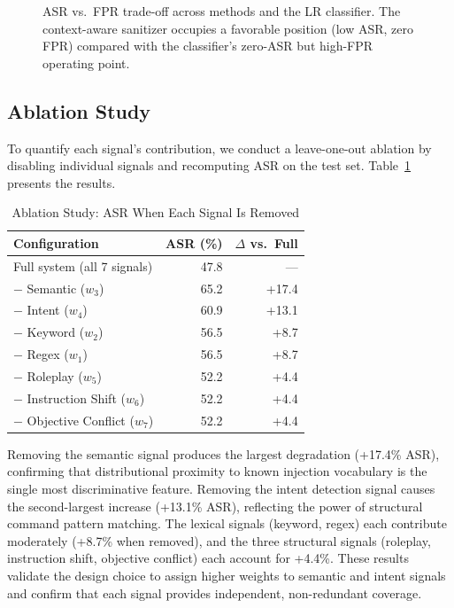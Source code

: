 \documentclass[10pt,conference]{IEEEtran}
\begin{document}
\begin{figure}[t]
  \centering
  \caption{ASR vs.\ FPR trade-off across methods and the LR
           classifier.
           The context-aware sanitizer occupies a favorable
           position (low ASR, zero FPR) compared with the
           classifier's zero-ASR but high-FPR operating point.}
  \label{fig:prc}
\end{figure}

\subsection{Ablation Study}

To quantify each signal's contribution, we conduct a leave-one-out
ablation by disabling individual signals and recomputing ASR on the
test set.
Table~\ref{tab:ablation} presents the results.

\begin{table}[t]
\caption{Ablation Study: ASR When Each Signal Is Removed}
\label{tab:ablation}
\centering
\begin{tabular}{lrr}
\toprule
Configuration & ASR (\%) & $\Delta$ vs.\ Full \\
\midrule
Full system (all 7 signals)    & 47.8 & — \\
\midrule
$-$ Semantic ($w_3$)           & 65.2 & +17.4 \\
$-$ Intent ($w_4$)             & 60.9 & +13.1 \\
$-$ Keyword ($w_2$)            & 56.5 & +8.7  \\
$-$ Regex ($w_1$)              & 56.5 & +8.7  \\
$-$ Roleplay ($w_5$)           & 52.2 & +4.4  \\
$-$ Instruction Shift ($w_6$)  & 52.2 & +4.4  \\
$-$ Objective Conflict ($w_7$) & 52.2 & +4.4  \\
\bottomrule
\end{tabular}
\end{table}

Removing the semantic signal produces the largest degradation
(+17.4\% ASR), confirming that distributional proximity to known
injection vocabulary is the single most discriminative feature.
Removing the intent detection signal causes the second-largest
increase (+13.1\% ASR), reflecting the power of structural command
pattern matching.
The lexical signals (keyword, regex) each contribute moderately
(+8.7\% when removed), and the three structural signals (roleplay,
instruction shift, objective conflict) each account for +4.4\%.
These results validate the design choice to assign higher weights
to semantic and intent signals and confirm that each signal provides
independent, non-redundant coverage.
\end{document}
